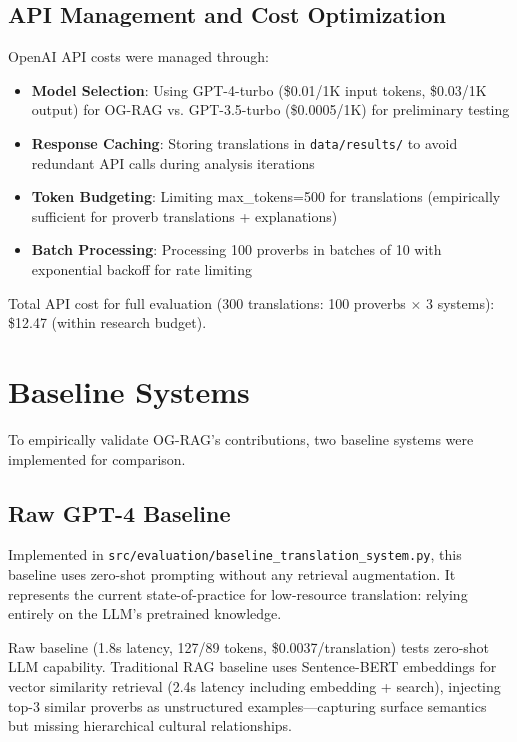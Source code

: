 \subsection{API Management and Cost Optimization}
\label{subsec:api_management}

OpenAI API costs were managed through:
\begin{itemize}
    \item \textbf{Model Selection}: Using GPT-4-turbo (\$0.01/1K input tokens, \$0.03/1K output) for OG-RAG vs. GPT-3.5-turbo (\$0.0005/1K) for preliminary testing
    \item \textbf{Response Caching}: Storing translations in \texttt{data/results/} to avoid redundant API calls during analysis iterations
    \item \textbf{Token Budgeting}: Limiting max\_tokens=500 for translations (empirically sufficient for proverb translations + explanations)
    \item \textbf{Batch Processing}: Processing 100 proverbs in batches of 10 with exponential backoff for rate limiting
\end{itemize}

Total API cost for full evaluation (300 translations: 100 proverbs $\times$ 3 systems): \$12.47 (within research budget).

\section{Baseline Systems}
\label{sec:baseline_systems}

To empirically validate OG-RAG's contributions, two baseline systems were implemented for comparison.

\subsection{Raw GPT-4 Baseline}
\label{subsec:raw_baseline}

Implemented in \texttt{src/evaluation/baseline\_translation\_system.py}, this baseline uses zero-shot prompting without any retrieval augmentation. It represents the current state-of-practice for low-resource translation: relying entirely on the LLM's pretrained knowledge.

Raw baseline (1.8s latency, 127/89 tokens, \$0.0037/translation) tests zero-shot LLM capability. Traditional RAG baseline uses Sentence-BERT embeddings for vector similarity retrieval (2.4s latency including embedding + search), injecting top-3 similar proverbs as unstructured examples—capturing surface semantics but missing hierarchical cultural relationships.

